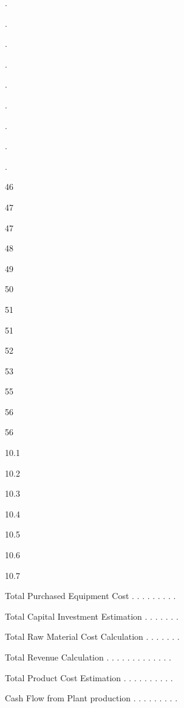 \documentclass[a4paper,portrait,12pt]{article}
\begin{document}
.


.


.


.


.


.


.


.


.





46


47


47


48


49


50


51


51


52


53


55


56


56





10.1


10.2


10.3


10.4


10.5


10.6


10.7





\begin{flushleft}
Total Purchased Equipment Cost . . . . . . . . .
\end{flushleft}


\begin{flushleft}
Total Capital Investment Estimation . . . . . . .
\end{flushleft}


\begin{flushleft}
Total Raw Material Cost Calculation . . . . . . .
\end{flushleft}


\begin{flushleft}
Total Revenue Calculation . . . . . . . . . . . . .
\end{flushleft}


\begin{flushleft}
Total Product Cost Estimation . . . . . . . . . .
\end{flushleft}


\begin{flushleft}
Cash Flow from Plant production . . . . . . . . .
\end{flushleft}
\end{document}

